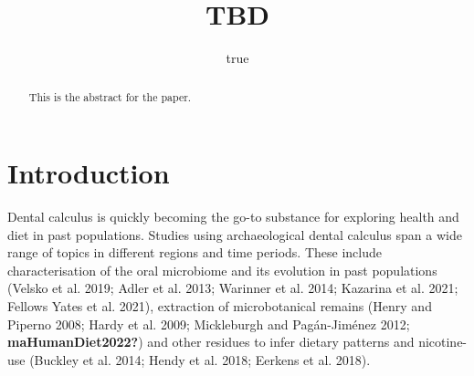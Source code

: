 \documentclass[
]{article}
\title{TBD}
\author{true}
\date{}
\begin{document}
\maketitle
\begin{abstract}
This is the abstract for the paper.
\end{abstract}
\ifdefined\Shaded\renewenvironment{Shaded}{\begin{tcolorbox}[boxrule=0pt, sharp corners, interior hidden, borderline west={3pt}{0pt}{shadecolor}, enhanced, breakable, frame hidden]}{\end{tcolorbox}}\fi

\hypertarget{introduction}{%
\section{Introduction}\label{introduction}}

Dental calculus is quickly becoming the go-to substance for exploring
health and diet in past populations. Studies using archaeological dental
calculus span a wide range of topics in different regions and time
periods. These include characterisation of the oral microbiome and its
evolution in past populations (Velsko et al. 2019; Adler et al. 2013;
Warinner et al. 2014; Kazarina et al. 2021; Fellows Yates et al. 2021),
extraction of microbotanical remains (Henry and Piperno 2008; Hardy et
al. 2009; Mickleburgh and Pagán-Jiménez 2012; \textbf{maHumanDiet2022?})
and other residues to infer dietary patterns and nicotine-use (Buckley
et al. 2014; Hendy et al. 2018; Eerkens et al. 2018).
\end{document}
